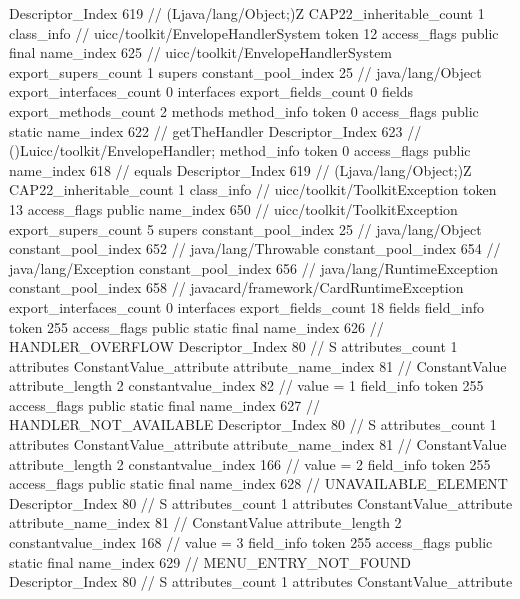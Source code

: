 {{{{{					Descriptor_Index	619		// (Ljava/lang/Object;)Z
				}
			}
			CAP22_inheritable_count	1
		}
		class_info {		// uicc/toolkit/EnvelopeHandlerSystem
			token	12
			access_flags	public final
			name_index	625		// uicc/toolkit/EnvelopeHandlerSystem
			export_supers_count	1
			supers {
				constant_pool_index	25		// java/lang/Object
			}
			export_interfaces_count	0
			interfaces {
			}
			export_fields_count	0
			fields {
			}
			export_methods_count	2
			methods {
				method_info {
					token	0
					access_flags	public static
					name_index	622		// getTheHandler
					Descriptor_Index	623		// ()Luicc/toolkit/EnvelopeHandler;
				}
				method_info {
					token	0
					access_flags	public
					name_index	618		// equals
					Descriptor_Index	619		// (Ljava/lang/Object;)Z
				}
			}
			CAP22_inheritable_count	1
		}
		class_info {		// uicc/toolkit/ToolkitException
			token	13
			access_flags	public
			name_index	650		// uicc/toolkit/ToolkitException
			export_supers_count	5
			supers {
				constant_pool_index	25		// java/lang/Object
				constant_pool_index	652		// java/lang/Throwable
				constant_pool_index	654		// java/lang/Exception
				constant_pool_index	656		// java/lang/RuntimeException
				constant_pool_index	658		// javacard/framework/CardRuntimeException
			}
			export_interfaces_count	0
			interfaces {
			}
			export_fields_count	18
			fields {
			field_info {
				token	255
				access_flags	public static final
				name_index	626		// HANDLER_OVERFLOW
				Descriptor_Index	80		// S
				attributes_count	1
				attributes {
				ConstantValue_attribute {
					attribute_name_index	81		// ConstantValue
					attribute_length	2
					constantvalue_index	82		// value = 1
				}
				}
			}
			field_info {
				token	255
				access_flags	public static final
				name_index	627		// HANDLER_NOT_AVAILABLE
				Descriptor_Index	80		// S
				attributes_count	1
				attributes {
				ConstantValue_attribute {
					attribute_name_index	81		// ConstantValue
					attribute_length	2
					constantvalue_index	166		// value = 2
				}
				}
			}
			field_info {
				token	255
				access_flags	public static final
				name_index	628		// UNAVAILABLE_ELEMENT
				Descriptor_Index	80		// S
				attributes_count	1
				attributes {
				ConstantValue_attribute {
					attribute_name_index	81		// ConstantValue
					attribute_length	2
					constantvalue_index	168		// value = 3
				}
				}
			}
			field_info {
				token	255
				access_flags	public static final
				name_index	629		// MENU_ENTRY_NOT_FOUND
				Descriptor_Index	80		// S
				attributes_count	1
				attributes {
				ConstantValue_attribute {
}}}}}}}
